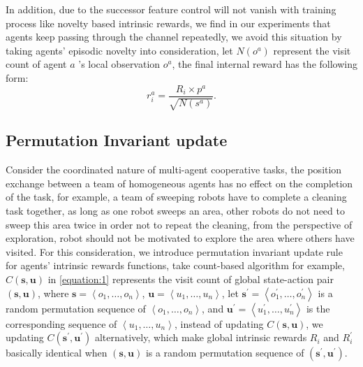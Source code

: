 \documentclass{article} %
\begin{document}
In addition, due to the successor feature control will not vanish with training process like novelty based intrinsic rewards, we find in our experiments that agents keep passing through the channel repeatedly, we avoid this situation by taking agents' episodic novelty into consideration, let $N\left(o^{a}\right)$ represent the visit count of agent $a$ 's local observation $o^{a}$, the final internal reward has the following form: 
\begin{equation}
\label{equation:10}
r_{i}^{a}=\frac{R_{i} \times p^{a}}{\sqrt{N\left(s^{a}\right)}}.
\end{equation}

\subsection{Permutation Invariant update}
Consider the coordinated nature of multi-agent cooperative tasks, the position exchange between a team of homogeneous agents has no effect on the completion of the task, for example, a team of sweeping robots have to complete a cleaning task together, as long as one robot sweeps an area, other robots do not need to sweep this area twice in order not to repeat the cleaning, from the perspective of exploration, robot should not be motivated to explore the area where others have visited. For this consideration, we introduce permutation invariant update rule for agents' intrinsic rewards functions, take count-based algorithm for example, $C(\boldsymbol{s}, \boldsymbol{u})$ in \ref{equation:1} represents the visit count of global state-action pair $(\boldsymbol{s}, \boldsymbol{u})$, where $\boldsymbol{s}=\left\langle o_{1}, \ldots, o_{n}\right\rangle$, $\boldsymbol{u}=\left\langle u_{1}, \ldots, u_{n}\right\rangle$, let $\boldsymbol{s}^{\prime}=\left\langle o_{1}^{\prime}, \ldots, o_{n}^{\prime}\right\rangle$ is a random permutation sequence of $\left\langle o_{1}, \ldots, o_{n}\right\rangle$, and $\boldsymbol{u}^{\prime}=\left\langle u_{1}^{\prime}, \ldots, u_{n}^{\prime}\right\rangle$ is the corresponding sequence of $\left\langle u_{1}, \ldots, u_{n}\right\rangle$, instead of updating $C(\boldsymbol{s}, \boldsymbol{u})$, we updating $C(\boldsymbol{s}^{\prime}, \boldsymbol{u}^{\prime})$ alternatively, which make global intrinsic rewards $R_{i}$ and $R_{i}^{\prime}$ 
basically identical when $(\boldsymbol{s}, \boldsymbol{u})$ is a random permutation sequence of $(\boldsymbol{s}^{\prime}, \boldsymbol{u}^{\prime})$.


\iffalse
\end{document}
